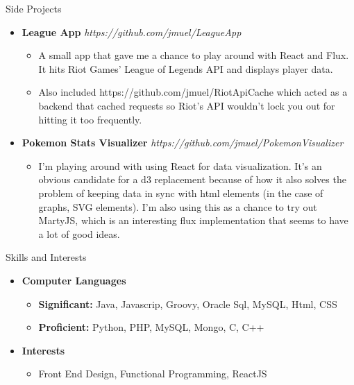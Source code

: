 \documentclass[11pt.oneside]{article}
\newenvironment{ressection}[1]{
    \vspace{4pt}
    {\fontfamily{phv}\selectfont\Large#1}
    \begin{itemize}
    \vspace{3pt} 
}{
    \end{itemize}
}
\newcommand{\resitem}[1]{
    \vspace{-4pt}
    \item \begin{flushleft}#1 \end{flushleft}
}
\newcommand{\ressubitem}[1]{
    \vspace{-1pt}
    \item \begin{flushleft}#1 \end{flushleft}
}
\newcommand{\resbigitem}[3]{
    \vspace{-5pt}
    \item
    \textbf{#1}  #2 
    \hfill
    \textit{#3}
}
\newenvironment{ressubsec}[3]{
    \resbigitem{#1}{#2}{#3}
    \vspace{-2pt}
    \begin{itemize} 
}{
    \end{itemize}
}
\newenvironment{reslist}[1]{
    \resitem{\textbf{#1}}
    \vspace{-5pt}
    \begin{itemize}
}{
    \end{itemize}
}
\begin{document}
\begin{ressection}{Side Projects}
  \begin{ressubsec}{League App}{}{https://github.com/jmuel/LeagueApp}
    \ressubitem{A small app that gave me a chance to play around with React and Flux. It hits Riot Games' League of Legends API and displays player data.}
    \ressubitem{Also included https://github.com/jmuel/RiotApiCache which acted as a backend that cached requests so Riot's API wouldn't lock you out for hitting it too frequently.}
  \end{ressubsec}
  \begin{ressubsec}{Pokemon Stats Visualizer}{}{https://github.com/jmuel/PokemonVisualizer}
    \ressubitem{I'm playing around with using React for data visualization. It's an obvious candidate for a d3 replacement because of how it also solves the problem of keeping data in sync with html elements (in the case of graphs, SVG elements). I'm also using this as a chance to try out MartyJS, which is an interesting flux implementation that seems to have a lot of good ideas.}
  \end{ressubsec}
\end{ressection}

\begin{ressection}{Skills and Interests}
    \begin{reslist}{Computer Languages}
        \ressubitem{\textbf{Significant:} Java, Javascrip, Groovy, Oracle Sql, MySQL, Html, CSS}
        \ressubitem{\textbf{Proficient:} Python, PHP, MySQL, Mongo, C, C++}
    \end{reslist}
    \begin{reslist}{Interests}
        \ressubitem{Front End Design, Functional Programming, ReactJS}
    \end{reslist}
\end{ressection}
\end{document}
